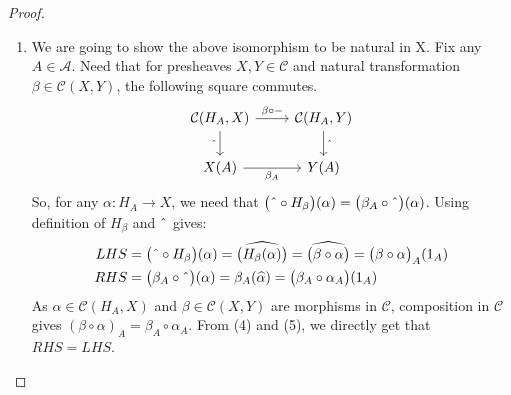 \documentclass[18pt,a4paper]{article}
\theoremstyle{definition}
\begin{document}
\begin{proof}
\begin{enumerate}[label=\Roman*]
				\begin{enumerate}[label=(\roman*)]
					\item We are going to show the above isomorphism to be natural in X.
						Fix any $A \in \mathcal{A}$. Need that for
						presheaves $X,Y \in \mathcal{C}$ and
						natural transformation $\beta \in \mathcal{C} (X,Y)$, the following
						square commutes.
						\begin{equation*}
							\begin{tikzcd}
								\mathcal{C}(H_A,X) \arrow[swap]{d}{ \string ^}
								\arrow{r}{\beta \circ -}
			& \mathcal{C}(H_A,Y) \arrow{d}{\string ^}\\
			X(A) \arrow[swap]{r}{\beta_A}
			& Y(A)
							\end{tikzcd}
						\end{equation*}
						So, for any $\alpha:H_A \to X$, we need that
						$\big( \string ^ \circ H_\beta \big)(\alpha) = \big( \beta_A \circ \string ^
						\big)(\alpha)$. Using definition of $H_\beta$ and $\string ^$ gives:
						\begin{align}
							LHS & = \big( \string ^ \circ H_\beta \big)(\alpha) =
							\widehat{\big(  H_\beta(\alpha)\big)}=
							\widehat{\big(  \beta \circ \alpha\big)}
							=\big(  \beta \circ \alpha\big)_A(1_A) \\
							RHS & = \big( \beta_A \circ \string ^ \big)(\alpha)
							= \beta_A (\widehat{\alpha}) =\big( \beta_A \circ \alpha_A\big)(1_A)
						\end{align}
						As $\alpha \in \mathcal{C} (H_A,X)$ and $\beta \in \mathcal{C}(X,Y)$
						are morphisms in $\mathcal{C}$, composition in $\mathcal{C}$ gives
						$(\beta \circ \alpha)_A = \beta_A \circ \alpha_A$. From (4) and (5), we
						directly get that $RHS=LHS$.


\end{enumerate}
\end{enumerate}
\end{proof}
\end{document}
